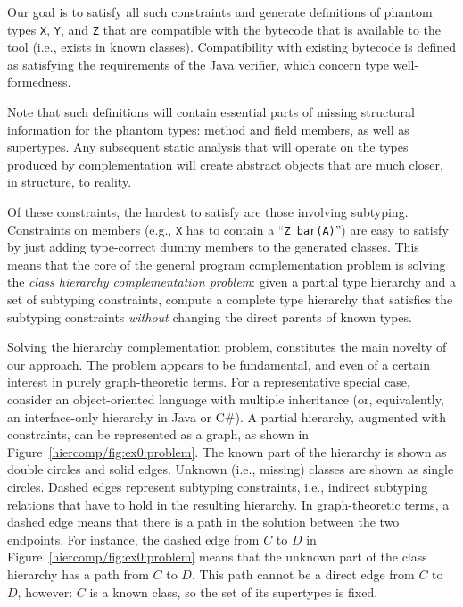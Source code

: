 \documentclass{llncs}
\newcommand{\code}[1]{\texttt{#1}}
\begin{document}
Our goal is to satisfy all such constraints and
generate definitions of phantom types \code{X}, \code{Y}, and \code{Z}
that are compatible with the bytecode that is available to the tool
(i.e., exists in known classes). Compatibility with existing bytecode
is defined as satisfying the requirements of the Java verifier, which
concern type well-formedness.

Note that such definitions will contain essential parts of missing
structural information for the phantom types: method and field
members, as well as supertypes. Any subsequent static analysis that
will operate on the types produced by complementation will create abstract
objects that are much closer, in structure, to reality.

Of these constraints, the hardest to satisfy are those involving
subtyping.  Constraints on members (e.g., \code{X} has to contain a
``\code{Z bar(A)}'') are easy to satisfy by just adding type-correct
dummy members to the generated classes. This means that the core of
the general program complementation problem is solving the \emph{class
  hierarchy complementation problem}: given a partial type hierarchy
and a set of subtyping constraints, compute a complete type hierarchy
that satisfies the subtyping constraints \emph{without} changing the
direct parents of known types.

Solving the hierarchy complementation problem, constitutes the main
novelty of our approach. The problem appears to be fundamental, and
even of a certain interest in purely graph-theoretic terms. For a
representative special case, consider an object-oriented language with
multiple inheritance (or, equivalently, an interface-only hierarchy in
Java or C\#).  A partial hierarchy, augmented with constraints, can be
represented as a graph, as shown in
Figure~\ref{hiercomp/fig:ex0:problem}. The known part of the hierarchy
is shown as double circles and solid edges. Unknown (i.e., missing)
classes are shown as single circles. Dashed edges represent subtyping
constraints, i.e., indirect subtyping relations that have to hold in
the resulting hierarchy. In graph-theoretic terms, a dashed edge means
that there is a path in the solution between the two endpoints. For
instance, the dashed edge from $C$ to $D$ in
Figure~\ref{hiercomp/fig:ex0:problem} means that the unknown part of
the class hierarchy has a path from $C$ to $D$. This path cannot be a
direct edge from $C$ to $D$, however: $C$ is a known class, so the set
of its supertypes is fixed.
\end{document}
